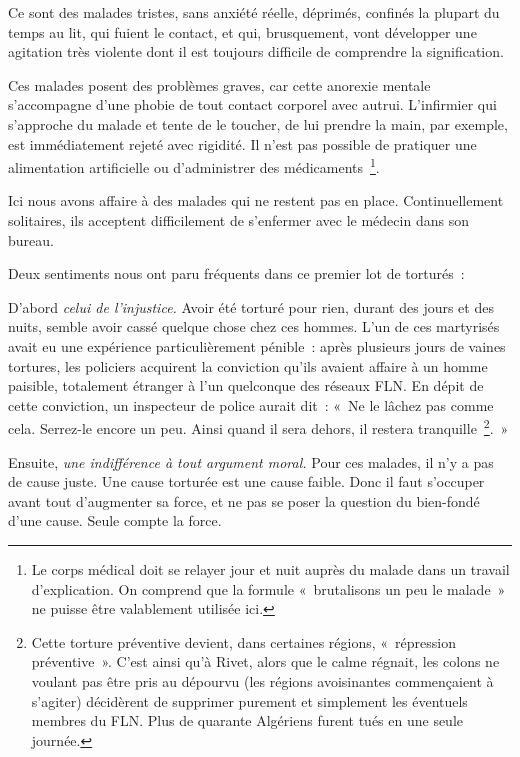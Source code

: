 \documentclass[french,twoside]{book} %
\begin{document}
\bigbreak
{}\par
Ce sont des malades tristes, sans anxiété réelle, déprimés, confinés la plupart du temps au lit, qui fuient le contact, et qui, brusquement, vont développer une agitation très violente dont il est toujours difficile de comprendre la signification.\par
\bigbreak
{}\par
Ces malades posent des problèmes graves, car cette anorexie mentale s’accompagne d’une phobie de tout contact corporel avec autrui. L’infirmier qui s’approche du malade et tente de le toucher, de lui prendre la main, par exemple, est immédiatement rejeté avec rigidité. Il n’est pas possible de pratiquer une alimentation artificielle ou d’administrer des médicaments \footnote{Le corps médical doit se relayer jour et nuit auprès du malade dans un travail d’explication. On comprend que la formule « brutalisons un peu le malade » ne puisse être valablement utilisée ici.}.\par
\bigbreak
{}\par
Ici nous avons affaire à des malades qui ne restent pas en place. Continuellement solitaires, ils acceptent difficilement de s’enfermer avec le médecin dans son bureau.\par
\bigbreak
\noindent Deux sentiments nous ont paru fréquents dans ce premier lot de torturés :\par
D’abord \emph{celui de l’injustice.} Avoir été torturé pour rien, durant des jours et des nuits, semble avoir cassé quelque chose chez ces hommes. L’un de ces martyrisés avait eu une expérience particulièrement pénible : après plusieurs jours de vaines tortures, les policiers acquirent la conviction qu’ils avaient affaire à un homme paisible, totalement étranger à l’un   quelconque des réseaux FLN. En dépit de cette conviction, un inspecteur de police aurait dit : « Ne le lâchez pas comme cela. Serrez-le encore un peu. Ainsi quand il sera dehors, il restera tranquille \footnote{Cette torture préventive devient, dans certaines régions, « répression préventive ». C’est ainsi qu’à Rivet, alors que le calme régnait, les colons ne voulant pas être pris au dépourvu (les régions avoisinantes commençaient à s’agiter) décidèrent de supprimer purement et simplement les éventuels membres du FLN. Plus de quarante Algériens furent tués en une seule journée.}. »\par
Ensuite, \emph{une indifférence à tout argument moral.} Pour ces malades, il n’y a pas de cause juste. Une cause torturée est une cause faible. Donc il faut s’occuper avant tout d’augmenter sa force, et ne pas se poser la question du bien-fondé d’une cause. Seule compte la force.
\end{document}
